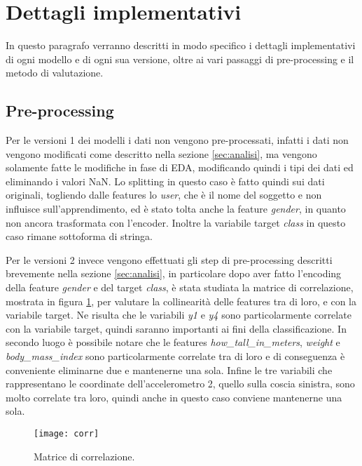 \section{Dettagli implementativi}\label{sec:implementazione}
In questo paragrafo verranno descritti in modo specifico i dettagli implementativi di ogni modello e di ogni sua versione, oltre ai vari passaggi di pre-processing e il metodo di valutazione.

\subsection{Pre-processing}\label{subsec:prepr}
Per le versioni 1 dei modelli i dati non vengono pre-processati, infatti i dati non vengono modificati come descritto nella sezione \ref{sec:analisi}, ma vengono solamente fatte le modifiche in fase di EDA, modificando quindi i tipi dei dati ed eliminando i valori NaN. Lo splitting in questo caso è fatto quindi sui dati originali, togliendo dalle features lo \textit{user}, che è il nome del soggetto e non influisce sull'apprendimento, ed è stato tolta anche la feature \textit{gender}, in quanto non ancora trasformata con l'encoder. Inoltre la variabile target \textit{class} in questo caso rimane sottoforma di stringa.

Per le versioni 2 invece vengono effettuati gli step di pre-processing descritti brevemente nella sezione \ref{sec:analisi}, in particolare dopo aver fatto l'encoding della feature \textit{gender} e del target \textit{class}, è stata studiata la matrice di correlazione, mostrata in figura \ref{fig:corr}, per valutare la collinearità delle features tra di loro, e con la variabile target. Ne risulta che le variabili \textit{y1} e \textit{y4} sono particolarmente correlate con la variabile target, quindi saranno importanti ai fini della classificazione. In secondo luogo è possibile notare che le features \textit{how\_tall\_in\_meters}, \textit{weight} e \textit{body\_mass\_index} sono particolarmente correlate tra di loro e di conseguenza è conveniente eliminarne due e mantenerne una sola. Infine le tre variabili che rappresentano le coordinate dell'accelerometro 2, quello sulla coscia sinistra, sono molto correlate tra loro, quindi anche in questo caso conviene mantenerne una sola.

\begin{figure}[ht]
    \centering\texttt{[image: corr]}
    \caption{Matrice di correlazione.}
    \label{fig:corr}
\end{figure}

